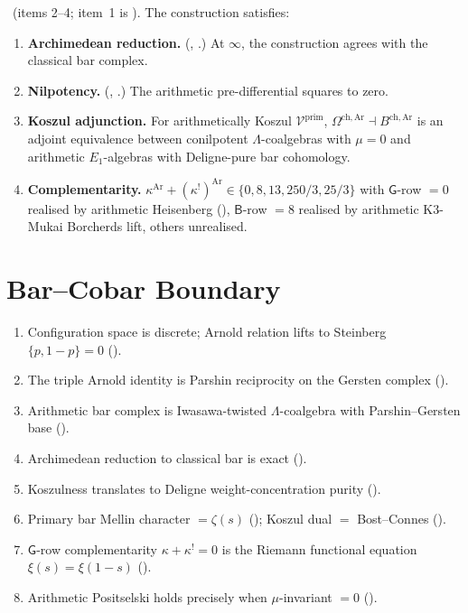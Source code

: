 \begin{theorem}[verifications]
\label{v4-arith:thm:bar-verifications}
\ClaimStatusConjectured\ (items 2--4; item~1 is
\ClaimStatusProvedHere). The construction satisfies:
\begin{enumerate}
\item \textbf{Archimedean reduction.} (\ClaimStatusProvedHere,
.) At \(\infty\), the
construction agrees with the classical bar complex.
\item \textbf{Nilpotency.} (\ClaimStatusConjectured,
.) The arithmetic
pre-differential squares to zero.
\item \textbf{Koszul adjunction.} For arithmetically Koszul
\(\mathcal{V}^{\mathrm{prim}}\), \(\Omega^{\mathrm{ch,Ar}}\dashv B^{\mathrm{ch,Ar}}\)
is an adjoint equivalence between conilpotent \(\Lambda\)-coalgebras
with \(\mu=0\) and arithmetic \(E_{1}\)-algebras with Deligne-pure bar
cohomology.
\item \textbf{Complementarity.}
\(\kappa^{\mathrm{Ar}}+(\kappa^{!})^{\mathrm{Ar}}\in\{0,8,13,250/3,25/3\}\)
with \(\mathsf{G}\)-row \(=0\) realised by arithmetic Heisenberg
(), \(\mathsf{B}\)-row \(=8\)
realised by arithmetic K3-Mukai Borcherds lift, others
unrealised.
\end{enumerate}
\end{theorem}

\section{Bar--Cobar Boundary}
\label{v4-arith:bar:summary}

\begin{enumerate}
\item Configuration space is discrete; Arnold relation lifts to
Steinberg \(\{p,1-p\}=0\)
().
\item The triple Arnold identity is Parshin reciprocity on the
Gersten complex ().
\item Arithmetic bar complex is Iwasawa-twisted
\(\Lambda\)-coalgebra with Parshin--Gersten base
().
\item Archimedean reduction to classical bar is exact
().
\item Koszulness translates to Deligne weight-concentration
purity ().
\item Primary bar Mellin character \(=\zeta(s)\)
(); Koszul dual \(=\) Bost--Connes
().
\item \(\mathsf{G}\)-row complementarity \(\kappa+\kappa^{!}=0\) is
the Riemann functional equation \(\xi(s)=\xi(1-s)\)
().
\item Arithmetic Positselski holds precisely when
\(\mu\)-invariant \(=0\) ().
\end{enumerate}


